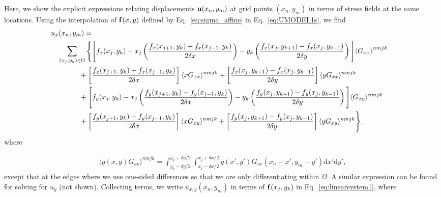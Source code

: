 \documentclass[aps,prl,reprint,twocolumn,groupedaddress,showpacs]{revtex4}
\def\dd{\mbox{d}}
\def\f{{\bf f}}
\def\u{{\bf u}}
\begin{document}
\begin{widetext}
Here, we show the explicit expressions relating displacements $\u(x_{n}, y_{m})$ at 
grid points $(x_{n},y_{m})$ in terms of stress fields at the same locations. Using 
the interpolation of $\f(x,y)$ defined by Eq.~\ref{eq:sigma_affine} in 
Eq.~\ref{eq:UMODEL1s}, we find
%
\begin{align}
\lefteqn{u_x(x_n,y_m) =}  \nonumber\\
 & \quad \sum_{(x_j,y_k)\in\Omega} \Bigg\{ \Bigg[f_{x}(x_j,y_k)
- x_j\left(\frac{f_{x}(x_{j+1},y_k) - f_{x}(x_{j-1},y_k)}{2\delta x}\right)
 -y_k\left( \frac{f_{x}(x_j,y_{k+1}) -
f_{x}(x_j,y_{k-1})}{2\delta y}\right) \Bigg]{\langle G_{xx} \rangle}^{nmjk} \nonumber \\
& \qquad\qquad +\left[ \frac{f_{x}(x_{j+1},y_k) -
f_{x}(x_{j-1},y_k)}{2\delta x}\right]\langle xG_{xx} \rangle^{nmjk} 
+ \left[  \frac{f_{x}(x_j,y_{k+1}) - f_{x}(x_j,y_{k-1}) }{2\delta y} \right]
\langle yG_{xx} \rangle^{nmjk}\nonumber\\
&\qquad\qquad + \Bigg[f_{y}(x_j,y_k)-x_j\left(\frac{f_{y}(x_{j+1},y_k)-
f_{y}(x_{j-1},y_k) }{2\delta x}\right)-y_k\left( \frac{f_{y}(x_j,y_{k+1}) 
-f_{y}(x_j,y_{k-1}) }{2\delta y}\right) \Bigg] \langle G_{xy} \rangle^{nmjk}\nonumber \\
&\qquad\qquad +\left[ \frac{f_{y}(x_{j+1},y_k) - f_{y}(x_{j-1},y_k) }{2\delta x}\right]  
\langle xG_{xy} \rangle^{nmjk} + 
\left[\frac{f_{y}(x_j,y_{k+1}) - 
f_{y}(x_j,y_{k-1}) }{2\delta y}\right]\langle yG_{xy} \rangle^{nmjk} \Bigg\},
\label{eq:ux_decomposed}
\end{align}
%
where

\begin{align}
\langle g(x,y)G_{uv} \rangle^{nmjk} = \int_{y_k-\delta y/2}^{y_k+\delta y/2} 
\int_{x_j-\delta x/2}^{x_j+\delta x/2} g(x',y')
G_{uv}(x_n-x',y_m-y')\dd x'\dd y', \label{eq:G_ave} 
\end{align}
%
except that at the edges where we use one-sided differences so that we
are only differentiating within $\Omega$. A similar expression can be
found for solving for $u_y$ (not shown). Collecting terms, we 
write $u_{x,y}(x_{n},y_{m})$ in terms of $\f(x_{j}, y_{k})$ 
in Eq.~\ref{eq:linearsystem1}, where 


\end{widetext}
\end{document}
